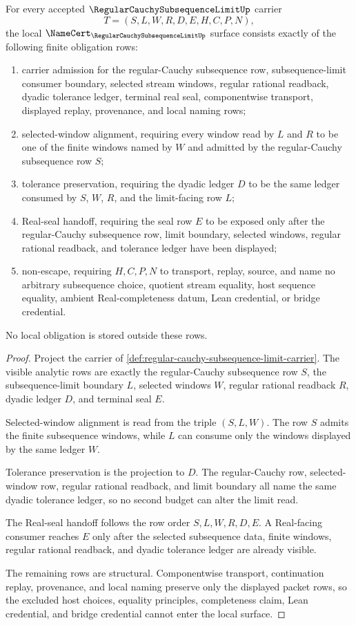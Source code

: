 \begin{theorem}
\label{thm:regular-cauchy-subsequence-limit-namecert-obligations}
For every accepted $\RegularCauchySubsequenceLimitUp$ carrier
$$
T=(S,L,W,R,D,E,H,C,P,N),
$$
the local $\NameCert_{\RegularCauchySubsequenceLimitUp}$ surface consists exactly of the following finite obligation rows:
\begin{enumerate}
\item carrier admission for the regular-Cauchy subsequence row, subsequence-limit consumer boundary, selected stream windows, regular rational readback, dyadic tolerance ledger, terminal real seal, componentwise transport, displayed replay, provenance, and local naming rows;
\item selected-window alignment, requiring every window read by $L$ and $R$ to be one of the finite windows named by $W$ and admitted by the regular-Cauchy subsequence row $S$;
\item tolerance preservation, requiring the dyadic ledger $D$ to be the same ledger consumed by $S$, $W$, $R$, and the limit-facing row $L$;
\item Real-seal handoff, requiring the seal row $E$ to be exposed only after the regular-Cauchy subsequence row, limit boundary, selected windows, regular rational readback, and tolerance ledger have been displayed;
\item non-escape, requiring $H,C,P,N$ to transport, replay, source, and name no arbitrary subsequence choice, quotient stream equality, host sequence equality, ambient Real-completeness datum, Lean credential, or bridge credential.
\end{enumerate}
No local obligation is stored outside these rows.
\end{theorem}
\begin{proof}
Project the carrier of \autoref{def:regular-cauchy-subsequence-limit-carrier}. The visible analytic rows are exactly the regular-Cauchy subsequence row $S$, the subsequence-limit boundary $L$, selected windows $W$, regular rational readback $R$, dyadic ledger $D$, and terminal seal $E$.

Selected-window alignment is read from the triple $(S,L,W)$. The row $S$ admits the finite subsequence windows, while $L$ can consume only the windows displayed by the same ledger $W$.

Tolerance preservation is the projection to $D$. The regular-Cauchy row, selected-window row, regular rational readback, and limit boundary all name the same dyadic tolerance ledger, so no second budget can alter the limit read.

The Real-seal handoff follows the row order $S,L,W,R,D,E$. A Real-facing consumer reaches $E$ only after the selected subsequence data, finite windows, regular rational readback, and dyadic tolerance ledger are already visible.

The remaining rows are structural. Componentwise transport, continuation replay, provenance, and local naming preserve only the displayed packet rows, so the excluded host choices, equality principles, completeness claim, Lean credential, and bridge credential cannot enter the local surface.
\end{proof}

